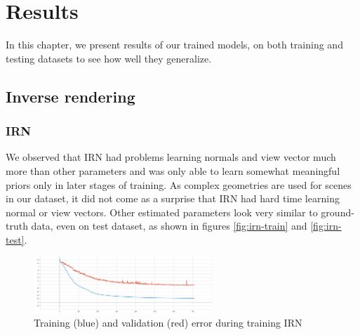 \chapter{Results}
\label{kap:results}

In this chapter, we present results of our trained models, on both training and testing datasets to see how well they generalize.

\section{Inverse rendering}
\subsection{IRN}
We observed that IRN had problems learning normals and view vector much more than other parameters and was only able to learn somewhat meaningful priors only in later stages of training. As complex geometries are used for scenes in our dataset, it did not come as a surprise that IRN had hard time learning normal or view vectors. Other estimated parameters look very similar to ground-truth data, even on test dataset, as shown in figures \ref{fig:irn-train} and \ref{fig:irn-test}.
\begin{figure}[H]
    \centerline{\includegraphics[width=0.6\textwidth]{praca/images/Training-IRN.png}}
    \caption[Training and validation error for IRN]{Training (blue) and validation (red) error during training IRN}
    \label{img:training-irn}
\end{figure}
